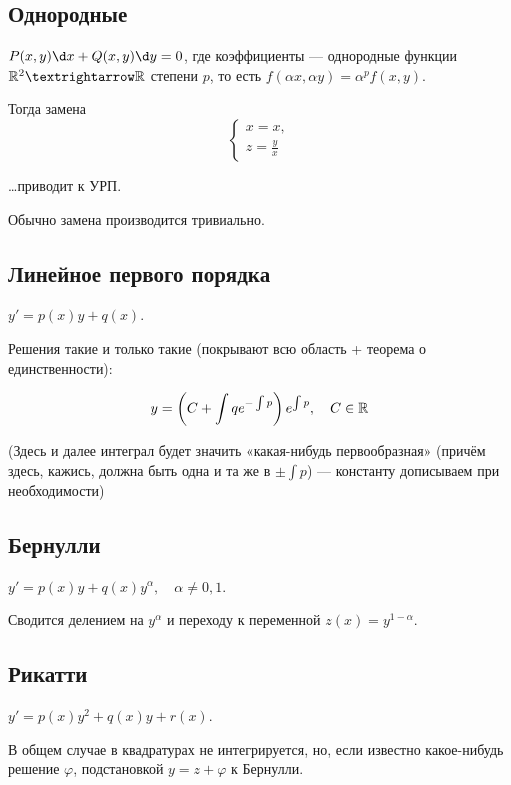 \documentclass[12pt, a4paper]{article}
\begin{document}
\subsection{Однородные}

$P(x, y) \d x + Q(x, y) \d y = 0$, где коэффициенты — однородные функции $\sR^2 → \sR$ степени $p$, то есть $f(\alpha x, \alpha y) = \alpha^p f(x, y)$.

Тогда замена
\begin{equation}
    \begin{cases}
        x = x, \\
        z = \frac{y}{x}
    \end{cases}
\end{equation}

…приводит к УРП.

Обычно замена производится тривиально.

\subsection{Линейное первого порядка}

$y' = p(x)y + q(x)$.

Решения такие и только такие (покрывают всю область + теорема о единственности):

\begin{equation}
    y = \left(C + \int q e^{-\int p} \right) e^{\int p}, \quad C \in {\mathbb{R}}
\end{equation}

(Здесь и далее интеграл будет значить «какая-нибудь первообразная» 
(причём здесь, кажись, должна быть одна и та же в $±\int p$) 
— константу дописываем при необходимости)

\subsection{Бернулли}

$y' = p(x)y + q(x)y^{\alpha}, \quad \alpha ≠ 0, 1$.

Сводится делением на $y^{\alpha}$ и переходу к переменной $z(x) = y^{1 - \alpha}$.

\subsection{Рикатти}

$y' = p(x)y^2 + q(x)y + r(x)$.

В общем случае в квадратурах не интегрируется, 
но, если известно какое-нибудь решение $\varphi$, подстановкой $y = z + \varphi$ к Бернулли.
\end{document}
